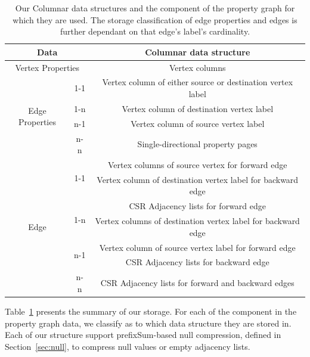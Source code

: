 \begin{table}[t!]
	\centering
	\bgroup
	\setlength{\tabcolsep}{10pt}
	\def\arraystretch{1.3}%
	\begin{tabular}{ |c|c|c| } 
		\hline
		\multicolumn{2}{|c|}{\textbf{Data}} & \textbf{Columnar data structure} \\
		\hline \hline
		\multicolumn{2}{|c|}{Vertex Properties} & Vertex columns \\
		\hline \hline
		\multirow{4}{60pt}{Edge Properties} & 1-1 & Vertex column of either source or destination vertex label\\
		\cline{2-3}
		& 1-n & Vertex column of destination vertex label\\
		\cline{2-3}
		& n-1 & Vertex column of source vertex label\\
		\cline{2-3}
		& n-n & Single-directional property pages \\
		\hline \hline
		\multirow{7}{60pt}{Edge} & \multirow{2}{20pt}{1-1} & Vertex columns of source vertex for forward edge \\
		&& Vertex column of destination vertex label for backward edge \\
		\cline{2-3}
		& \multirow{2}{20pt}{1-n} & CSR Adjacency lists for forward edge \\
		&& Vertex columns of destination vertex label for backward edge \\
		\cline{2-3}
		& \multirow{2}{20pt}{n-1} & Vertex column of source vertex label for forward edge \\
		&& CSR Adjacency lists for backward edge \\
		\cline{2-3}
		& \multirow{1}{20pt}{n-n} & CSR Adjacency lists for forward and backward edges \\
		\hline
	\end{tabular}
	\egroup
	\captionsetup{justification=centering}
	\caption{Our Columnar data structures and the component of the property graph for which they are used. The storage classification of edge properties and edges is further dependant on that edge's label's cardinality.}
	\label{tbl:summ}
\end{table}

Table~\ref{tbl:summ} presents the summary of our storage. For each of the component in the property graph data, we classify as to which data structure they are stored in. Each of our structure support prefixSum-based null compression, defined in Section~\ref{sec:null}, to compress null values or empty adjacency lists.
